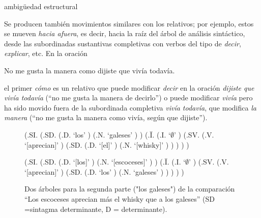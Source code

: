 \begin{persabermes}{ambigüedad estructural}
\begin{enumerate}
Se producen también movimientos similares con los relativos; por ejemplo, estos se mueven \emph{hacia afuera}, es decir, hacia la raíz del árbol de análisis sintáctico, desde las subordinadas sustantivas completivas con verbos del tipo de {\em decir}, \emph{explicar}, etc. En la oración \begin{example} No me gusta la manera como dijiste que vivía todavía. \end{example} el primer \emph{cómo} es un relativo que puede modificar \emph{decir} en la oración \emph{dijiste que vivía todavía} (``no me gusta la manera de decirlo'') o puede modificar {\em vivía} pero ha sido movido fuera de la subordinada completiva \emph{vivía todavía}, que modifica {\em la manera} (``no me gusta la manera como vivía, según que dijiste''). \end{enumerate} \end{persabermes} 

\begin{figure} \begin{center} \begin{parsetree} (.SI. (.SD. (.D. `los' ) (.N. `galeses' ) ) (.{\={I}}. (.I. `$\emptyset$' ) (.SV. (.V. `[aprecian]' ) (.SD. (.D. `[el]' ) (.N. `[whisky]' ) ) ) ) ) \end{parsetree} \end{center} \begin{center} \begin{parsetree} (.SI. (.SD. (.D. `[los]' ) (.N. `[escoceses]' ) ) (.{\={I}}. (.I. `$\emptyset$' ) (.SV. (.V. `[aprecian]' ) (.SD. (.D. `los' ) (.N. `galeses' ) ) ) ) ) \end{parsetree} \end{center} \caption{Dos árboles para la segunda parte ("los galeses") de la comparación ``Los escoceses aprecian más el whisky que a los galeses'' (SD =sintagma determinante, D = determinante).} \label{fg:whisky} \end{figure} 

